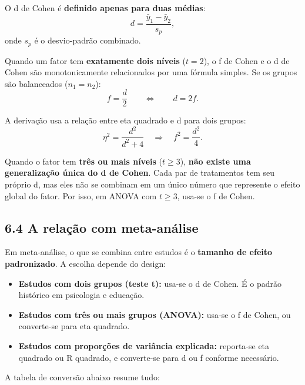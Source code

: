 \documentclass[
]{article}
\providecommand{\tightlist}{%
  \setlength{\itemsep}{0pt}\setlength{\parskip}{0pt}}
\begin{document}
O d de Cohen é \textbf{definido apenas para duas médias}:
\[d = \frac{\bar y_1 - \bar y_2}{s_p},\] onde \(s_p\) é o desvio-padrão
combinado.

Quando um fator tem \textbf{exatamente dois níveis} (\(t = 2\)), o f de
Cohen e o d de Cohen são monotonicamente relacionados por uma fórmula
simples. Se os grupos são balanceados (\(n_1 = n_2\)):
\[f = \frac{d}{2} \qquad \Longleftrightarrow \qquad d = 2f.\]

A derivação usa a relação entre eta quadrado e d para dois grupos:
\[\eta^2 = \frac{d^2}{d^2 + 4} \quad \Longrightarrow \quad f^2 = \frac{d^2}{4}.\]

Quando o fator tem \textbf{três ou mais níveis} (\(t \geq 3\)),
\textbf{não existe uma generalização única do d de Cohen}. Cada par de
tratamentos tem seu próprio d, mas eles não se combinam em um único
número que represente o efeito global do fator. Por isso, em ANOVA com
\(t \geq 3\), usa-se o f de Cohen.

\subsection{6.4 A relação com
meta-análise}\label{a-relauxe7uxe3o-com-meta-anuxe1lise}

Em meta-análise, o que se combina entre estudos é o \textbf{tamanho de
efeito padronizado}. A escolha depende do design:

\begin{itemize}
\tightlist
\item
  \textbf{Estudos com dois grupos (teste t):} usa-se o d de Cohen. É o
  padrão histórico em psicologia e educação.
\item
  \textbf{Estudos com três ou mais grupos (ANOVA):} usa-se o f de Cohen,
  ou converte-se para eta quadrado.
\item
  \textbf{Estudos com proporções de variância explicada:} reporta-se eta
  quadrado ou R quadrado, e converte-se para d ou f conforme necessário.
\end{itemize}

A tabela de conversão abaixo resume tudo:
\end{document}
